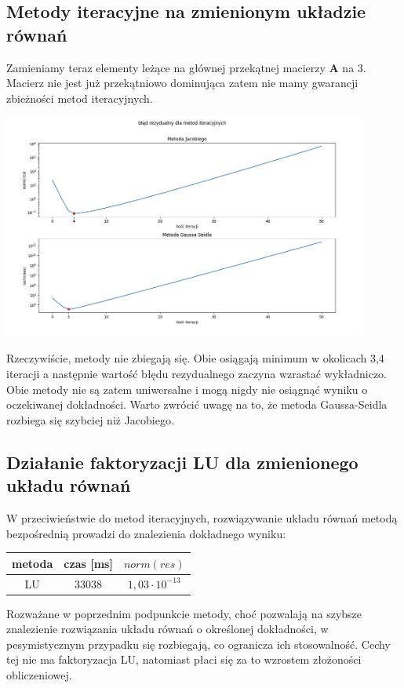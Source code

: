 \documentclass{article}
\begin{document}
\subsection{Metody iteracyjne na zmienionym układzie równań}
Zamieniamy teraz elementy leżące na głównej przekątnej macierzy $\boldsymbol{A}$ na 3.
Macierz nie jest już przekątniowo dominująca zatem nie mamy gwarancji zbieżności metod iteracyjnych.
\begin{center}
	\includegraphics[width=12cm]{z3_residuum}
\end{center}
Rzeczywiście, metody nie zbiegają się. Obie osiągają minimum w okolicach 3,4 iteracji a następnie
wartość błędu rezydualnego zaczyna wzrastać wykładniczo. Obie metody nie są zatem uniwersalne
i mogą nigdy nie osiągnąć wyniku o oczekiwanej dokładności. Warto zwrócić uwagę na to, że
metoda Gaussa-Seidla rozbiega się szybciej niż Jacobiego.

\subsection{Działanie faktoryzacji LU dla zmienionego układu równań}
W przeciwieństwie do metod iteracyjnych, rozwiązywanie układu równań metodą bezpośrednią prowadzi
do znalezienia dokładnego wyniku: 
\begin{center}
\begin{tabular}{ c | c c}
 metoda & czas [ms] & $norm(res)$ \\ 
\hline
 LU & 33038 & $1,03 \cdot 10^{-13}$\\  
\end{tabular}
\end{center}
Rozważane w poprzednim podpunkcie metody, choć pozwalają na szybsze 
znalezienie rozwiązania układu równań o określonej dokładności, 
w pesymistycznym przypadku się rozbiegają, co ogranicza ich stosowalność.
Cechy tej nie ma faktoryzacja LU, natomiast płaci się za to wzrostem złożoności obliczeniowej.
\end{document}
